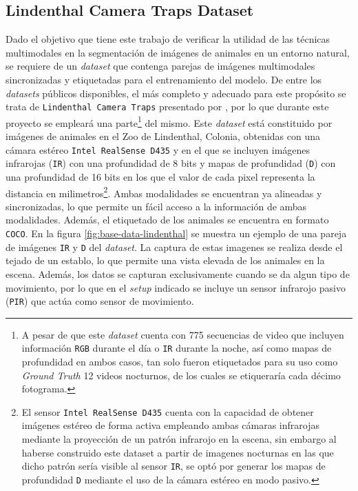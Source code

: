 \documentclass[12pt,a4paper]{report}
\begin{document}
\subsection{Lindenthal Camera Traps Dataset}
\label{subsec:lindenthal_dataset}
Dado el objetivo que tiene este trabajo de verificar la utilidad de las técnicas multimodales en la segmentación de imágenes de animales en un entorno natural, se requiere de un \textit{dataset} que contenga parejas de imágenes multimodales sincronizadas y etiquetadas para el entrenamiento del modelo. De entre los \textit{datasets} públicos disponibles, el más completo y adecuado para este propósito se trata de \texttt{Lindenthal Camera Traps} presentado por \cite{haucke2021exploitingdepthinformationwildlife}, por lo que durante este proyecto se empleará una parte\footnote{A pesar de que este \textit{dataset} cuenta con 775 secuencias de video que incluyen información \texttt{RGB} durante el día o \texttt{IR} durante la noche, así como mapas de profundidad en ambos casos, tan solo fueron etiquetados para su uso como \textit{Ground Truth} 12 videos nocturnos, de los cuales se etiqueraría cada décimo fotograma.} del mismo. Este \textit{dataset} está constituido por imágenes de animales en el Zoo de Lindenthal, Colonia, obtenidas con una cámara estéreo \texttt{Intel RealSense D435} y en el que se incluyen imágenes infrarojas (\texttt{IR}) con una profundidad de 8 bits y mapas de profundidad (\texttt{D}) con una profundidad de 16 bits en los que el valor de cada pixel representa la distancia en milimetros\footnote{El sensor \texttt{Intel RealSense D435} cuenta con la capacidad de obtener imágenes estéreo de forma activa empleando ambas cámaras infrarojas mediante la proyección de un patrón infrarojo en la escena, sin embargo al haberse construido este dataset a partir de imagenes nocturnas en las que dicho patrón sería visible al sensor \texttt{IR}, se optó por generar los mapas de profundidad \texttt{D} mediante el uso de la cámara estéreo en modo pasivo.}. Ambas modalidades se encuentran ya alineadas y sincronizadas, lo que permite un fácil acceso a la información de ambas modalidades. Además, el etiquetado de los animales se encuentra en formato \texttt{COCO}. En la figura \ref{fig:base-data-lindenthal} se muestra un ejemplo de una pareja de imágenes \texttt{IR} y \texttt{D} del \textit{dataset}. La captura de estas imagenes se realiza desde el tejado de un establo, lo que permite una vista elevada de los animales en la escena. Además, los datos se capturan exclusivamente cuando se da algun tipo de movimiento, por lo que en el \textit{setup} indicado se incluye un sensor infrarojo pasivo (\texttt{PIR}) que actúa como sensor de movimiento.
\end{document}
